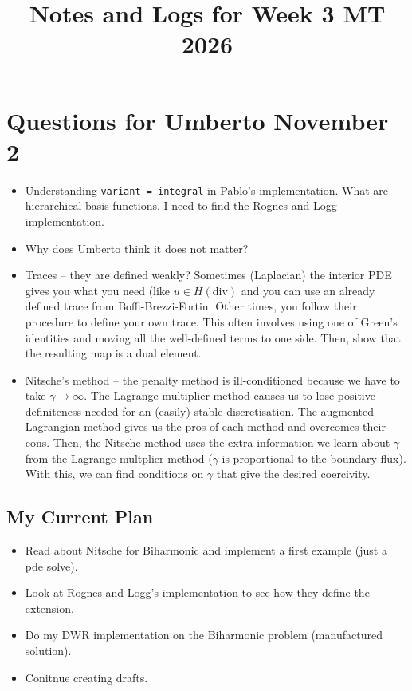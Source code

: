 \documentclass[12pt,a4paper]{article}
\title{\textbf{Notes and Logs for Week 3 MT 2026}}
\author{}
\date{}
\begin{document}
\maketitle

\section{Questions for Umberto November 2}

\begin{itemize}
    \item Understanding \texttt{variant = integral} in Pablo's implementation. What are hierarchical basis functions. I need to find the Rognes and Logg implementation.
    \item Why does Umberto think it does not matter?
    \item Traces -- they are defined weakly? Sometimes (Laplacian) the interior PDE gives you what you need (like $u \in H(\text{div})$ and you can use an already defined trace from Boffi-Brezzi-Fortin. Other times, you follow their procedure to define your own trace. This often involves using one of Green's identities and moving all the well-defined terms to one side. Then, show that the resulting map is a dual element. 

    \item Nitsche's method -- the penalty method is ill-conditioned because we have to take $\gamma \rightarrow \infty.$ The Lagrange multiplier method causes us to lose positive-definiteness needed for an (easily) stable discretisation.  The augmented Lagrangian method gives us the pros of each method and overcomes their cons. Then, the Nitsche method uses the extra information we learn about $\gamma$ from the Lagrange multplier method ($\gamma$ is proportional to the boundary flux). With this, we can find conditions on $\gamma$ that give the desired coercivity. 
\end{itemize}

\subsection{My Current Plan}

\begin{itemize}
    \item Read about Nitsche for Biharmonic and implement a first example (just a pde solve). 
    \item Look at Rognes and Logg's implementation to see how they define the extension. 
    \item Do my DWR implementation on the Biharmonic problem (manufactured solution). 
    \item Conitnue creating drafts. 
\end{itemize}
\end{document}
